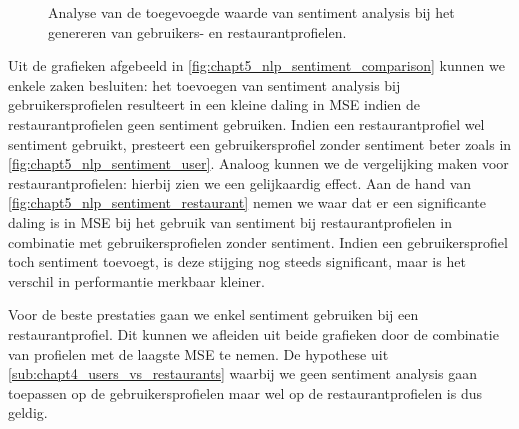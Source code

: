 \begin{figure}[H]
        \caption{Analyse van de toegevoegde waarde van sentiment analysis bij het genereren van gebruikers- en restaurantprofielen.}
        \label{fig:chapt5_nlp_sentiment_comparison}
\end{figure}

Uit de grafieken afgebeeld in \autoref{fig:chapt5_nlp_sentiment_comparison} kunnen we enkele zaken besluiten: het toevoegen van sentiment analysis bij gebruikersprofielen resulteert in een kleine daling in MSE indien de restaurantprofielen geen sentiment gebruiken. Indien een restaurantprofiel wel sentiment gebruikt, presteert een gebruikersprofiel zonder sentiment beter zoals in \autoref{fig:chapt5_nlp_sentiment_user}. Analoog kunnen we de vergelijking maken voor restaurantprofielen: hierbij zien we een gelijkaardig effect. Aan de hand van \autoref{fig:chapt5_nlp_sentiment_restaurant} nemen we waar dat er een significante daling is in MSE bij het gebruik van sentiment bij restaurantprofielen in combinatie met gebruikersprofielen zonder sentiment. Indien een gebruikersprofiel toch sentiment toevoegt, is deze stijging nog steeds significant, maar is het verschil in performantie merkbaar kleiner.

Voor de beste prestaties gaan we enkel sentiment gebruiken bij een restaurantprofiel. Dit kunnen we afleiden uit beide grafieken door de combinatie van profielen met de laagste MSE te nemen. De hypothese uit \autoref{sub:chapt4_users_vs_restaurants} waarbij we geen sentiment analysis gaan toepassen op de gebruikersprofielen maar wel op de restaurantprofielen is dus geldig. \\



